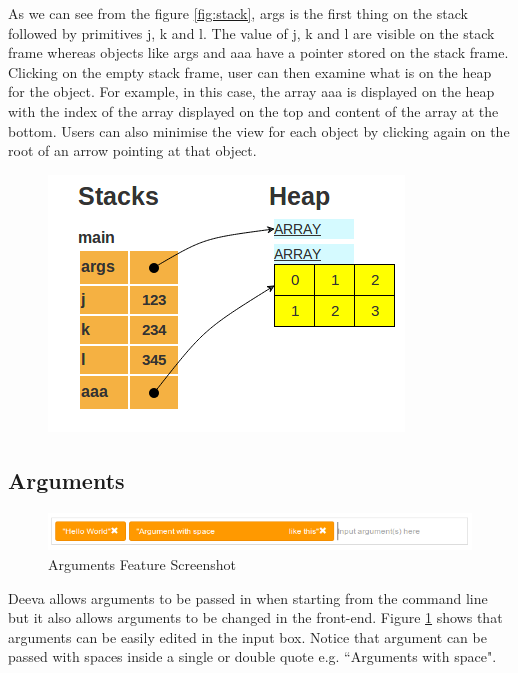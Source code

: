 \documentclass[11pt, a4paper]{article}
\begin{document}
As we can see from the figure \ref{fig:stack}, args is the first thing on the stack followed by primitives j, k and l.
The value of j, k and l are visible on the stack frame whereas objects like args and aaa have a pointer stored on the stack frame.
Clicking on the empty stack frame, user can then examine what is on the heap for the object.
For example, in this case, the array aaa is displayed on the heap with the index of the array displayed on the top and content of the array at the bottom.
Users can also minimise the view for each object by clicking again on the root of an arrow pointing at that object.
\begin{figure}[h!]
\centering
\includegraphics[scale=0.5]{heap.png}
\end{figure}

\subsection{Arguments}
\begin{figure}[h!]
\centering
\includegraphics[scale=0.7]{argumentFeature.png}
\caption{Arguments Feature Screenshot}
\label{fig:argumentFeature}
\end{figure}
Deeva allows arguments to be passed in when starting from the command line but it also allows arguments to be changed in the front-end.
Figure \ref{fig:argumentFeature} shows that arguments can be easily edited in the input box. Notice that argument can be passed with spaces inside a single or double quote e.g. ``Arguments with space".
\end{document}
